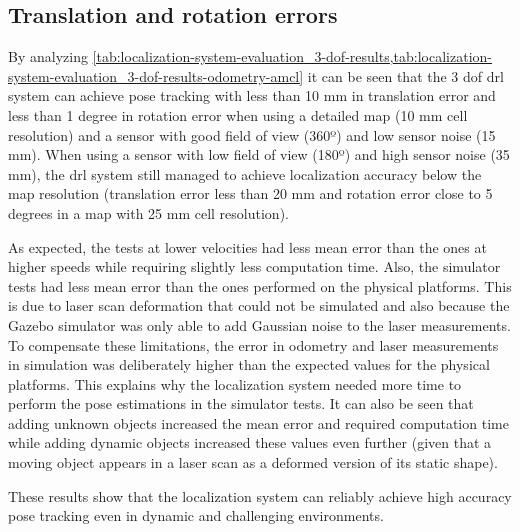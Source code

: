 \subsection{Translation and rotation errors}

By analyzing \cref{tab:localization-system-evaluation_3-dof-results,tab:localization-system-evaluation_3-dof-results-odometry-amcl} it can be seen that the 3 \gls{dof} \gls{drl} system can achieve pose tracking with less than 10 mm in translation error and less than 1 degree in rotation error when using a detailed map (10 mm cell resolution) and a sensor with good field of view (360º) and low sensor noise (15 mm). When using a sensor with low field of view (180º) and high sensor noise (35 mm), the \gls{drl} system still managed to achieve localization accuracy below the map resolution (translation error less than 20 mm and rotation error close to 5 degrees in a map with 25 mm cell resolution).

As expected, the tests at lower velocities had less mean error than the ones at higher speeds while requiring slightly less computation time. Also, the simulator tests had less mean error than the ones performed on the physical platforms. This is due to laser scan deformation that could not be simulated and also because the Gazebo simulator was only able to add Gaussian noise to the laser measurements. To compensate these limitations, the error in odometry and laser measurements in simulation was deliberately higher than the expected values for the physical platforms. This explains why the localization system needed more time to perform the pose estimations in the simulator tests. It can also be seen that adding unknown objects increased the mean error and required computation time while adding dynamic objects increased these values even further (given that a moving object appears in a laser scan as a deformed version of its static shape).

These results show that the localization system can reliably achieve high accuracy pose tracking even in dynamic and challenging environments.


